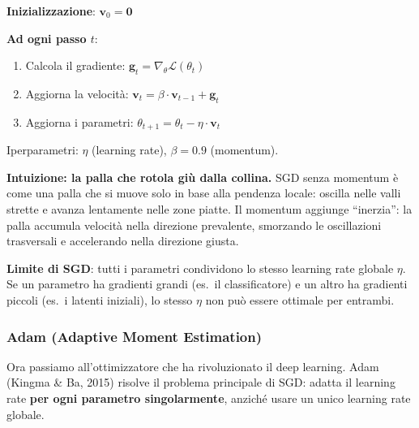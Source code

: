 \documentclass[12pt,a4paper]{article}
\begin{document}
\begin{formulabox}
\textbf{Inizializzazione}: $\mathbf{v}_0 = \mathbf{0}$

\textbf{Ad ogni passo $t$}:
\begin{enumerate}
    \item Calcola il gradiente: $\mathbf{g}_t = \nabla_\theta \mathcal{L}(\theta_t)$
    \item Aggiorna la velocit\`a: $\mathbf{v}_t = \beta \cdot \mathbf{v}_{t-1} + \mathbf{g}_t$
    \item Aggiorna i parametri: $\theta_{t+1} = \theta_t - \eta \cdot \mathbf{v}_t$
\end{enumerate}
Iperparametri: $\eta$ (learning rate), $\beta = 0.9$ (momentum).
\end{formulabox}

\textbf{Intuizione: la palla che rotola gi\`u dalla collina.} SGD senza momentum \`e come una palla che si muove solo in base alla pendenza locale: oscilla nelle valli strette e avanza lentamente nelle zone piatte. Il momentum aggiunge ``inerzia'': la palla accumula velocit\`a nella direzione prevalente, smorzando le oscillazioni trasversali e accelerando nella direzione giusta.

\textbf{Limite di SGD}: tutti i parametri condividono lo stesso learning rate globale $\eta$. Se un parametro ha gradienti grandi (es.\ il classificatore) e un altro ha gradienti piccoli (es.\ i latenti iniziali), lo stesso $\eta$ non pu\`o essere ottimale per entrambi.

\subsubsection{Adam (Adaptive Moment Estimation)}

Ora passiamo all'ottimizzatore che ha rivoluzionato il deep learning. Adam (Kingma \& Ba, 2015) risolve il problema principale di SGD: adatta il learning rate \textbf{per ogni parametro singolarmente}, anzich\'e usare un unico learning rate globale.
\end{document}
